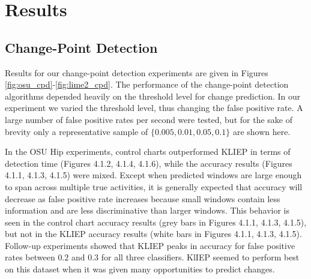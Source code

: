 \chapter{Results}
%

\section{Change-Point Detection}
\label{sec:cpd_results}

Results for our change-point detection experiments are given in
Figures \ref{fig:osu_cpd}-\ref{fig:lime2_cpd}.
The performance of the change-point detection algorithms
depended heavily on the threshold level for change prediction. In our
experiment we varied the threshold level, thus changing the false positive
rate. A large number of false positive rates per
second were tested, but for the sake of brevity only a representative sample
of $\{0.005, 0.01, 0.05, 0.1\}$ are shown here.

In the OSU Hip experiments, control charts outperformed KLIEP in terms of
detection time (Figures 4.1.2, 4.1.4, 4.1.6), while the accuracy results 
(Figures 4.1.1, 4.1.3, 4.1.5) were
mixed. Except when predicted windows are large enough to span across multiple
true activities, it is generally expected that accuracy will decrease as false
positive rate increases because small windows contain less information and are
less discriminative than larger windows. This behavior is seen in the control chart
accuracy results (grey bars in Figures 4.1.1, 4.1.3, 4.1.5), but not in the
KLIEP accuracy results (white bars in Figures 4.1.1, 4.1.3, 4.1.5).
Follow-up experiments showed that KLIEP peaks in accuracy for
false positive rates between $0.2$ and $0.3$ for all three classifiers.
KlIEP seemed to perform best on this dataset when it was given many
opportunities to predict changes.

